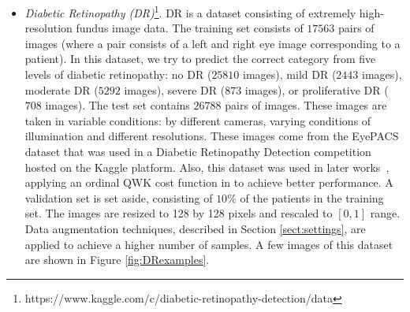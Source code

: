 \documentclass[journal]{IEEEtran}
\begin{document}
	\begin{itemize}
		\item \textit{Diabetic Retinopathy (DR)}\footnote{https://www.kaggle.com/c/diabetic-retinopathy-detection/data}. DR is a dataset consisting of extremely high-resolution fundus image data. The training set consists of $17563$ pairs of images (where a  pair consists of a left and right eye image corresponding to a patient). In this dataset, we try to predict the correct category from five levels of diabetic retinopathy: no DR ($25810$ images), mild DR ($2443$ images), moderate DR ($5292$ images), severe DR ($873$ images), or proliferative DR ($708$ images). The test set contains $26788$ pairs of images. These images are taken in variable conditions: by different cameras,  varying conditions of illumination and different resolutions. These images come from the EyePACS dataset that was used in a Diabetic Retinopathy Detection competition hosted on the Kaggle platform. Also, this dataset was used in later works~\cite{de2018weighted,nebot2016diabetic}, applying an ordinal QWK cost function in \cite{de2018weighted} to achieve better performance. A validation set is set aside, consisting of $10\%$ of the patients in the training set. The images are resized to 128 by 128 pixels and rescaled to $[0,1]$ range. Data augmentation techniques, described in Section \ref{sect:settings}, are applied to achieve a higher number of samples. A few images of this dataset are shown in Figure \ref{fig:DRexamples}.
		

\end{itemize}
\end{document}
